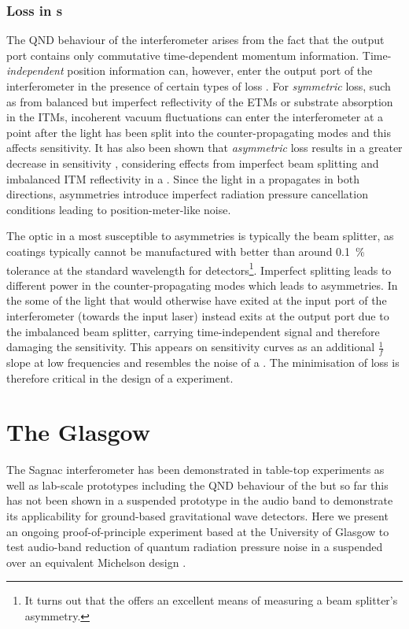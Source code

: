 \subsubsection{Loss in \SSM{}s}
The \gls{QND} behaviour of the interferometer arises from the fact that the output port contains only commutative time-dependent momentum information. Time-\emph{independent} position information can, however, enter the output port of the interferometer in the presence of certain types of loss \cite{Danilishin2004}. For \emph{symmetric} loss, such as from balanced but imperfect reflectivity of the \glspl{ETM} or substrate absorption in the \glspl{ITM}, incoherent vacuum fluctuations can enter the interferometer at a point after the light has been split into the counter-propagating modes and this affects sensitivity. It has also been shown that \emph{asymmetric} loss results in a greater decrease in sensitivity \cite{Danilishin2015}, considering effects from imperfect beam splitting and imbalanced \gls{ITM} reflectivity in a \SSM{}. Since the light in a \SSM{} propagates in both directions, asymmetries introduce imperfect radiation pressure cancellation conditions leading to position-meter-like noise.

The optic in a \SSM{} most susceptible to asymmetries is typically the beam splitter, as coatings typically cannot be manufactured with better than around \SI{0.1}{\percent} tolerance at the standard wavelength for detectors\footnote{It turns out that the \SSM{} offers an excellent means of measuring a beam splitter's asymmetry.}. Imperfect splitting leads to different power in the counter-propagating modes which leads to asymmetries. In the \SSM{} some of the light that would otherwise have exited at the input port of the interferometer (towards the input laser) instead exits at the output port due to the imbalanced beam splitter, carrying time-independent signal and therefore damaging the sensitivity. This appears on sensitivity curves as an additional $\frac{1}{f}$ slope at low frequencies and resembles the noise of a \MI{}. The minimisation of loss is therefore critical in the design of a \SSM{} experiment.

\section{The Glasgow \SSMEXPT{}}
The Sagnac interferometer has been demonstrated in table-top experiments \cite{Shaddock1998} as well as lab-scale prototypes \cite{Beyersdorf2002} including the \gls{QND} behaviour of the \SSM{} \cite{Eberle2010} but so far this has not been shown in a suspended prototype in the audio band to demonstrate its applicability for ground-based gravitational wave detectors. Here we present an ongoing proof-of-principle experiment based at the University of Glasgow to test audio-band reduction of quantum radiation pressure noise in a suspended \SSM{} over an equivalent Michelson design \cite{Graef2014}.


